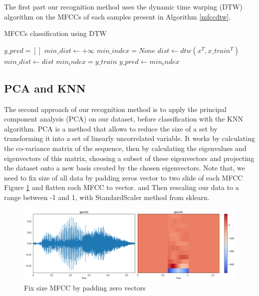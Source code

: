 \documentclass[%
  article,%
  10pt,%
  a4paper,%
  fleqn,%
  oneside,%
  sumario = tradicional,%
  chapter = TITLE,%
  section = TITLE,%
]{abntex2}
\begin{document}
The first part our recognition method uses the dynamic time warping (DTW) algorithm on the MFCCs of each samples present in Algorithm \ref{mfccdtw}.

\begin{algorithm}
  \caption{MFCCs classification using DTW}\label{mfccdtw}
  \begin{algorithmic}
    \State $y\_pred = []$
    	\State $min\_dist \gets +\infty$
	\State $min\_index = None$
   		 \State $dist \gets dtw(x^T, x\_train^T)$
    			\State $min\_dist \gets dist$
			\State $min_index = y\_train$
    		\EndIf
    	\EndFor
	\State $y\_pred \gets min_index$
    \EndFor
  \end{algorithmic}
\end{algorithm}

\subsection{PCA and KNN}
The second approach of our recognition method is to apply the principal component analysis (PCA) on our dataset, before classification with the KNN algorithm. PCA is a method that allows to reduce the size of a set by transforming it into a set of linearly uncorrelated variable. It works by calculating the co-variance matrix of the sequence, then by calculating the eigenvalues and eigenvectors of this matrix, choosing a subset of these eigenvectors and projecting the dataset onto a new basis created by the chosen eigenvectors\cite{8538414}. Note that, we need to fix size of all data by padding zeros vector to two slide of each MFCC Figure \ref{fig:mfccpadding} and flatten each MFCC to vector. and Then rescaling our data to a range between -1 and 1, with StandardScaler method from sklearn. 

\begin{figure}[H]
  \centering
  \includegraphics[width = 0.8\columnwidth]{./Figuras/mfccpadding}
  \caption{Fix size MFCC by padding zero vectors}
  \label{fig:mfccpadding}
\end{figure}
\end{document}
